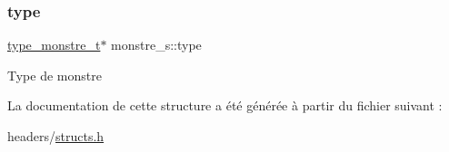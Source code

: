 \subsubsection{\texorpdfstring{type}{type}}
{\footnotesize\ttfamily \hyperlink{structtype__monstre__s}{type\+\_\+monstre\+\_\+t}$\ast$ monstre\+\_\+s\+::type}

Type de monstre 

La documentation de cette structure a été générée à partir du fichier suivant \+:\begin{DoxyCompactItemize}
\item 
headers/\hyperlink{structs_8h}{structs.\+h}\end{DoxyCompactItemize}
